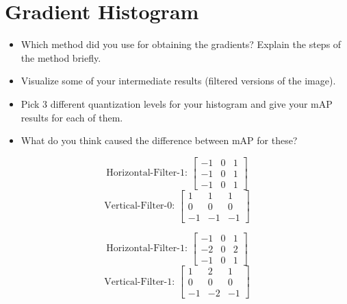 \documentclass[12pt]{article}
\begin{document}
\section{Gradient Histogram}

\begin{itemize}
\item Which method did you use for obtaining the gradients? Explain the steps of the method briefly.
\item Visualize some of your intermediate results (filtered versions of the image).
\item Pick 3 different quantization levels for your histogram and give your mAP results for each of them.
\item What do you think caused the difference between mAP for these?
\end{itemize}



\begin{minipage}{\textwidth}
	\begin{minipage}{0.49\textwidth}
	\[\text{Horizontal-Filter-1: }
	\begin{bmatrix}
	    -1 & 0 & 1 \\
	    -1 & 0 & 1 \\
	    -1 & 0 & 1
	\end{bmatrix}
	\]
	\linebreak
	\[
	\text{Vertical-Filter-0: }
	\begin{bmatrix}
	    1 & 1 & 1 \\
	    0 & 0 & 0 \\
	    -1 & -1 & -1
	\end{bmatrix}
	\]
	\end{minipage}
	\begin{minipage}{0.25\textwidth}
	\[\text{Horizontal-Filter-1: }
	\begin{bmatrix}
	    -1 & 0 & 1 \\
	    -2 & 0 & 2 \\
	    -1 & 0 & 1
	\end{bmatrix}
	\]
	\linebreak
	\[
	\text{Vertical-Filter-1: }
	\begin{bmatrix}
	    1 & 2 & 1 \\
	    0 & 0 & 0 \\
	    -1 & -2 & -1
	\end{bmatrix}
	\]
	\end{minipage}
\end{minipage}
\end{document}
